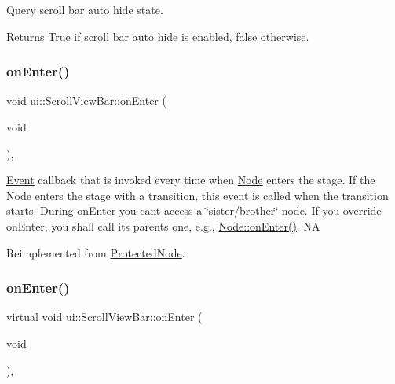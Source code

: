Query scroll bar auto hide state. 

\begin{DoxyReturn}{Returns}
True if scroll bar auto hide is enabled, false otherwise. 
\end{DoxyReturn}
\mbox{\label{classui_1_1ScrollViewBar_a6cf525ed1ead2a5b8e45de981bf2d0c1}} 
\subsubsection{\texorpdfstring{on\+Enter()}{onEnter()}\hspace{0.1cm}{\footnotesize\ttfamily [1/2]}}
{\footnotesize\ttfamily void ui\+::\+Scroll\+View\+Bar\+::on\+Enter (\begin{DoxyParamCaption}\item[{void}]{ }\end{DoxyParamCaption})\hspace{0.3cm}{\ttfamily [override]}, {\ttfamily [virtual]}}

\hyperlink{classEvent}{Event} callback that is invoked every time when \hyperlink{classNode}{Node} enters the \textquotesingle{}stage\textquotesingle{}. If the \hyperlink{classNode}{Node} enters the \textquotesingle{}stage\textquotesingle{} with a transition, this event is called when the transition starts. During on\+Enter you can\textquotesingle{}t access a \char`\"{}sister/brother\char`\"{} node. If you override on\+Enter, you shall call its parent\textquotesingle{}s one, e.\+g., \hyperlink{classNode_a7f51764c4afd5018a052b9ef71c03374}{Node\+::on\+Enter()}.  NA 

Reimplemented from \hyperlink{classProtectedNode_ade991090bee4173b4e1f47382adc99b9}{Protected\+Node}.

\mbox{\label{classui_1_1ScrollViewBar_a7f0ab392ce00fa9dbb9db54dfbe01e4a}} 
\subsubsection{\texorpdfstring{on\+Enter()}{onEnter()}\hspace{0.1cm}{\footnotesize\ttfamily [2/2]}}
{\footnotesize\ttfamily virtual void ui\+::\+Scroll\+View\+Bar\+::on\+Enter (\begin{DoxyParamCaption}\item[{void}]{ }\end{DoxyParamCaption})\hspace{0.3cm}{\ttfamily [override]}, {\ttfamily [virtual]}}

